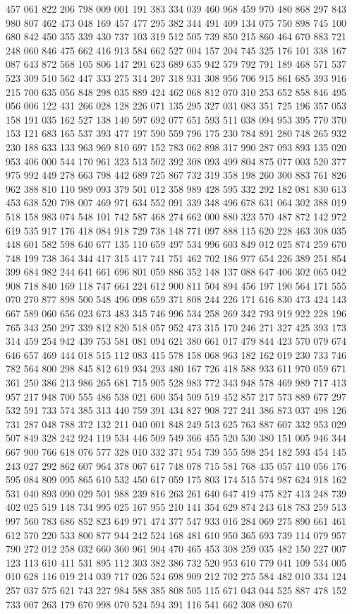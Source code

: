 \documentclass{article}
\begin{document}
{457 061 822 206 798 009 001 191 383 334 039 460 968 459 970 480 868 297 843 980 807 462 473 048 169 457 477 295 382 344 491 409 134 075 750 898 745 100 680 842 450 355 339 430 737 103 319 512 505 739 850 215 860 464 670 883 721 248 060 846 475 662 416 913 584 662 527 004 157 204 745 325 176 101 338 167 087 643 872 568 105 806 147 291 623 689 635 942 579 792 791 189 468 571 537 523 309 510 562 447 333 275 314 207 318 931 308 956 706 915 861 685 393 916 215 700 635 056 848 298 035 889 424 462 068 812 070 310 253 652 858 846 495 056 006 122 431 266 028 128 226 071 135 295 327 031 083 351 725 196 357 053 158 191 035 162 527 138 140 597 692 077 651 593 511 038 094 953 395 770 370 153 121 683 165 537 393 477 197 590 559 796 175 230 784 891 280 748 265 932 230 188 633 133 963 969 810 697 152 783 062 898 317 990 287 093 893 135 020 953 406 000 544 170 961 323 513 502 392 308 093 499 804 875 077 003 520 377 975 992 449 278 663 798 442 689 725 867 732 319 358 198 260 300 883 761 826 962 388 810 110 989 093 379 501 012 358 989 428 595 332 292 182 081 830 613 453 638 520 798 007 469 971 634 552 091 339 348 496 678 631 064 302 388 019 518 158 983 074 548 101 742 587 468 274 662 000 880 323 570 487 872 142 972 619 535 917 176 418 084 918 729 738 148 771 097 888 115 620 228 463 308 035 448 601 582 598 640 677 135 110 659 497 534 996 603 849 012 025 874 259 670 748 199 738 364 344 417 315 417 741 751 462 702 186 977 654 226 389 251 854 399 684 982 244 641 661 696 801 059 886 352 148 137 088 647 406 302 065 042 908 718 840 169 118 747 664 224 612 900 811 504 894 456 197 190 564 171 555 070 270 877 898 500 548 496 098 659 371 808 244 226 171 616 830 473 424 143 667 589 060 656 023 673 483 345 746 996 534 258 269 342 793 919 922 228 196 765 343 250 297 339 812 820 518 057 952 473 315 170 246 271 327 425 393 173 314 459 254 942 439 753 581 081 094 621 380 661 017 479 844 423 570 079 674 646 657 469 444 018 515 112 083 415 578 158 068 963 182 162 019 230 733 746 782 564 800 298 845 812 619 934 293 480 167 726 418 588 933 611 970 059 671 361 250 386 213 986 265 681 715 905 528 983 772 343 948 578 469 989 717 413 957 217 948 700 555 486 538 021 600 354 509 519 452 857 217 573 889 677 297 532 591 733 574 385 313 440 759 391 434 827 908 727 241 386 873 037 498 126 731 287 048 788 372 132 211 040 001 848 249 513 625 763 887 607 332 953 029 507 849 328 242 924 119 534 446 509 549 366 455 520 530 380 151 005 946 344 667 900 766 618 076 577 328 010 332 371 954 739 555 598 254 182 593 454 145 243 027 292 862 607 964 378 067 617 748 078 715 581 768 435 057 410 056 176 595 084 809 095 865 610 532 450 617 059 175 803 174 515 574 987 624 918 162 531 040 893 090 029 501 988 239 816 263 261 640 647 419 475 827 413 248 739 402 025 519 148 734 995 025 167 955 210 141 354 629 874 243 618 783 259 513 997 560 783 686 852 823 649 971 474 377 547 933 016 284 069 275 890 661 461 612 570 220 533 800 877 944 242 524 168 481 610 950 365 693 739 114 079 957 790 272 012 258 032 660 360 961 904 470 465 453 308 259 035 482 150 227 007 123 113 610 411 531 895 112 303 382 386 732 520 953 610 779 041 109 534 005 010 628 116 019 214 039 717 026 524 698 909 212 702 275 584 482 010 334 124 257 037 575 621 743 227 984 588 385 808 505 115 671 043 044 525 887 478 152 733 007 263 179 670 998 070 524 594 391 116 541 662 308 080 670 }
\end{document}
